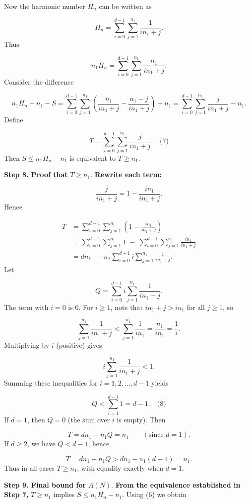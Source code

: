 Now the harmonic number \(H_n\) can be written as\par
\[
H_n = \sum_{i=0}^{d-1}\sum_{j=1}^{n_1}\frac{1}{i n_1 + j}.
\]
Thus\par
\[
n_1 H_n = \sum_{i=0}^{d-1}\sum_{j=1}^{n_1}\frac{n_1}{i n_1 + j}.
\]
Consider the difference\par
\[
n_1 H_n - n_1 - S = \sum_{i=0}^{d-1}\sum_{j=1}^{n_1}\left(\frac{n_1}{i n_1 + j} - \frac{n_1 - j}{i n_1 + j}\right) - n_1 = \sum_{i=0}^{d-1}\sum_{j=1}^{n_1}\frac{j}{i n_1 + j} - n_1.
\]
Define\par
\[
T = \sum_{i=0}^{d-1}\sum_{j=1}^{n_1}\frac{j}{i n_1 + j}. \quad\text{(7)}
\]
Then \(S \le n_1 H_n - n_1\) is equivalent to \(T \ge n_1\).\par
\textbf{Step 8. Proof that }\(T \ge n_1\).\textbf{ Rewrite each term:}\par
\[
\frac{j}{i n_1 + j} = 1 - \frac{i n_1}{i n_1 + j}.
\]
Hence\par
\[
\begin{aligned}
T &= \sum_{i=0}^{d-1}\sum_{j=1}^{n_1} \left(1 - \frac{i n_1}{i n_1 + j}\right) \\
&= \sum_{i=0}^{d-1}\sum_{j=1}^{n_1} 1 \;-\; \sum_{i=0}^{d-1}\sum_{j=1}^{n_1} \frac{i n_1}{i n_1 + j} \\
&= d n_1 \;-\; n_1 \sum_{i=0}^{d-1} i \sum_{j=1}^{n_1}\frac{1}{i n_1 + j}.
\end{aligned}
\]
Let\par
\[
Q = \sum_{i=0}^{d-1} i \sum_{j=1}^{n_1}\frac{1}{i n_1 + j}.
\]
The term with \(i=0\) is \(0\). For \(i \ge 1\), note that \(i n_1 + j > i n_1\) for all \(j\ge 1\), so\par
\[
\sum_{j=1}^{n_1}\frac{1}{i n_1 + j} < \sum_{j=1}^{n_1}\frac{1}{i n_1} = \frac{n_1}{i n_1} = \frac1i.
\]
Multiplying by \(i\) (positive) gives\par
\[
i \sum_{j=1}^{n_1}\frac{1}{i n_1 + j} < 1.
\]
Summing these inequalities for \(i = 1,2,\dots,d-1\) yields\par
\[
Q < \sum_{i=1}^{d-1} 1 = d-1. \quad\text{(8)}
\]
If \(d = 1\), then \(Q = 0\) (the sum over \(i\) is empty). Then\par
\[
T = d n_1 - n_1 Q = n_1 \qquad (\text{since } d=1).
\]
If \(d \ge 2\), we have \(Q < d-1\), hence\par
\[
T = d n_1 - n_1 Q > d n_1 - n_1 (d-1) = n_1.
\]
Thus in all cases \(T \ge n_1\), with equality exactly when \(d = 1\).\par
\textbf{Step 9. Final bound for }\(A(N)\).\textbf{ From the equivalence established in Step 7, }\(T \ge n_1\) implies \(S \le n_1 H_n - n_1\). Using (6) we obtain\par
